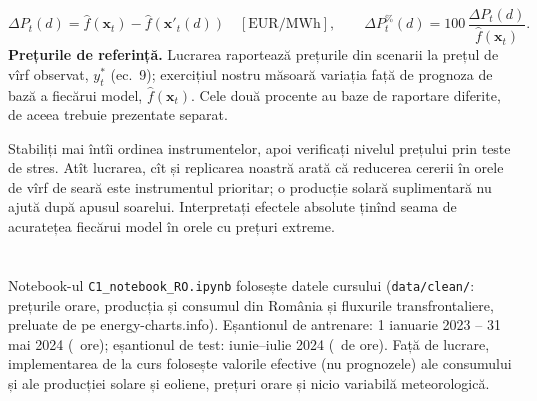 \[
\Delta P_t(d) = \hat f(\mathbf x_t) - \hat f(\mathbf x'_t(d)) \quad [\text{EUR/MWh}], \qquad \Delta P_t^{\%}(d) = 100\,\frac{\Delta P_t(d)}{\hat f(\mathbf x_t)} .
\]
%
{\textbf{Prețurile de referință.} Lucrarea raportează prețurile din scenarii la prețul de vîrf observat, $y^*_t$ (ec.~9); exercițiul nostru măsoară variația față de prognoza de bază a fiecărui model, $\hat f(\mathbf x_t)$.
Cele două procente au baze de raportare diferite, de aceea trebuie prezentate separat.}

\begin{decision}
%
{Stabiliți mai întîi ordinea instrumentelor, apoi verificați nivelul prețului prin teste de stres. Atît lucrarea, cît și replicarea noastră arată că reducerea cererii în orele de vîrf de seară este instrumentul prioritar; o producție solară suplimentară nu ajută după apusul soarelui.
Interpretați efectele absolute ținînd seama de acuratețea fiecărui model în orele cu prețuri extreme.}
\end{decision}

\section{}
%
{Notebook-ul \texttt{C1\_notebook\_RO.ipynb} folosește datele cursului (\texttt{data/clean/}: prețurile orare, producția și consumul din România și fluxurile transfrontaliere, preluate de pe energy-charts.info).
Eșantionul de antrenare: 1 ianuarie 2023 -- 31 mai 2024 (\NnTrain\ ore); eșantionul de test: iunie--iulie 2024 (\NnTest\ de ore). Față de lucrare, implementarea de la curs folosește valorile efective (nu prognozele) ale consumului și ale producției solare și eoliene, prețuri orare și nicio variabilă meteorologică.}


